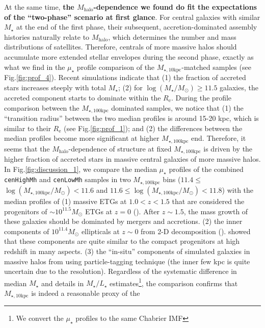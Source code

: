 \documentclass{emulateapj}
\def\rbcg{\texttt{cenHighMh}}
\def\nbcg{\texttt{cenLowMh}}
\def\mstar{{$M_{\star}$}}
\def\mhalo{{$M_{\mathrm{halo}}$}}
\def\logms{{$\log (M_{\star}/M_{\odot})$}}
\def\minn{{$M_{\star,10\mathrm{kpc}}$}}
\def\mtot{{$M_{\star,100\mathrm{kpc}}$}}
\def\logmtot{{$\log (M_{\star,100\mathrm{kpc}}/M_{\odot})$}}
\def\m2l{{$M_{\star}/L_{\star}$}}
\def\mden{{$\mu_{\star}$}}
\newcommand{\update}[1]{\textcolor{Bittersweet}{#1}}
\begin{document}
\begin{CJK*}{UTF8}{gbsn}
    At the same time, \textbf{the \mhalo{}-dependence we found do fit the expectations 
    of the ``two-phase'' scenario at first glance}. 
    For central galaxies with similar \mstar{} at the end of the first phase, 
    their subsequent, accretion-dominated assembly histories naturally relate to 
    \mhalo{}, which determines the number and mass distributions of satellites. 
    Therefore, centrals of more massive halos should accumulate more extended stellar 
    envelopes during the second phase, exactly as what we find in the \mden{} profile 
    comparison of the \minn{}-matched samples (see Fig.\ref{fig:prof_4}).
    Recent simulations indicate that (1) the fraction of accreted stars increases 
    steeply with total \mstar{}; (2) for \logms{}$\geq 11.5$ galaxies,
    the accreted component starts to dominate within the $R_{\mathrm{e}}$.  
    During the profile comparison between the \mtot{} dominated samples, we notice 
    that (1) the ``transition radius'' between the two median profiles is around
    15-20 kpc, which is similar to their $R_{\mathrm{e}}$ (see Fig.\ref{fig:prof_1}); 
    and (2) the differences between the median profiles become more significant at 
    higher \mtot{} end.
    Therefore, it seems that the \mhalo{}-dependence of structure at fixed \mtot{} 
    is driven by the higher fraction of accreted stars in massive central galaxies
    of more massive halos. 
    \update{
    In Fig.\ref{fig:discussion_1}, we compare the median \mden{} profiles of the 
    combined \rbcg{} and \nbcg{} samples in two \mtot{} bins 
    ($11.4\leq$\logmtot{}$<11.6$ and $11.6\leq$\logmtot{}$<11.8$) with the median profiles 
    of (1) massive ETGs at $1.0 < z < 1.5$ that are considered the progenitors of 
    $\sim 10^{11.5} M_{\odot}$ ETGs at $z=0$ (\citealt{Patel2013}).  
    After $z\sim 1.5$, the mass growth of these galaxies should be dominated by mergers 
    and accretions. 
    (2) the inner components of $10^{11.4} M_{\odot}$ ellipticals at $z\sim 0$ from 2-D 
    decomposition (\citealt{Huang2013a}). 
    \citep{Huang2013b} showed that these components are quite similar to the compact 
    progenitors at high redshift in many aspects.
    } 
    (3) the ``in-situ'' components of simulated galaxies in massive halos from 
    \citep{Cooper13} using particle-tagging technique (the inner few kpc is quite 
    uncertain due to the resolution).  
    Regardless of the systematic difference in median \mstar{} and details in 
    \m2l{} estimates\footnote{We convert the \mden{} profiles to the same Chabrier 
    IMF}, the comparison confirms that \minn{} is indeed a reasonable proxy of the 

\end{CJK*}
\end{document}
